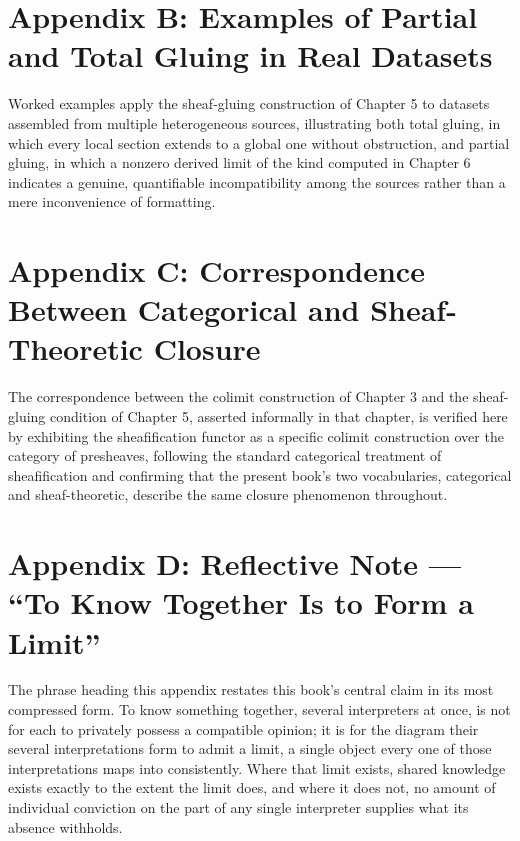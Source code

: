 \chapter*{Appendix B: Examples of Partial and Total Gluing in Real Datasets}

Worked examples apply the sheaf-gluing construction of Chapter 5 to datasets assembled from multiple heterogeneous sources, illustrating both total gluing, in which every local section extends to a global one without obstruction, and partial gluing, in which a nonzero derived limit of the kind computed in Chapter 6 indicates a genuine, quantifiable incompatibility among the sources rather than a mere inconvenience of formatting.

\chapter*{Appendix C: Correspondence Between Categorical and Sheaf-Theoretic Closure}

The correspondence between the colimit construction of Chapter 3 and the sheaf-gluing condition of Chapter 5, asserted informally in that chapter, is verified here by exhibiting the sheafification functor as a specific colimit construction over the category of presheaves, following the standard categorical treatment of sheafification and confirming that the present book's two vocabularies, categorical and sheaf-theoretic, describe the same closure phenomenon throughout.

\chapter*{Appendix D: Reflective Note --- ``To Know Together Is to Form a Limit''}

The phrase heading this appendix restates this book's central claim in its most compressed form. To know something together, several interpreters at once, is not for each to privately possess a compatible opinion; it is for the diagram their several interpretations form to admit a limit, a single object every one of those interpretations maps into consistently. Where that limit exists, shared knowledge exists exactly to the extent the limit does, and where it does not, no amount of individual conviction on the part of any single interpreter supplies what its absence withholds.
